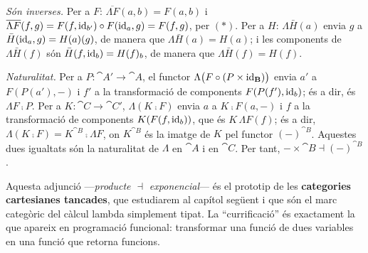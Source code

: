 \begin{prova}
\emph{Són inverses.} Per a $F$: $\overline{\Lambda F}(a,b)=F(a,b)$ i $\overline{\Lambda F}(f,g)=F(f,\operatorname{id}_{b'})\circ F(\operatorname{id}_a,g)=F(f,g)$, per $(\ast)$. Per a $H$: $\Lambda\bar H(a)$ envia $g$ a $\bar H(\operatorname{id}_a,g)=H(a)(g)$, de manera que $\Lambda\bar H(a)=H(a)$; i les components de $\Lambda\bar H(f)$ són $\bar H(f,\operatorname{id}_b)=H(f)_b$, de manera que $\Lambda\bar H(f)=H(f)$.

\emph{Naturalitat.} Per a $P\colon\cat{A}'\to\cat{A}$, el functor $\Lambda\bigl(F\circ(P\times\operatorname{id}_{\mathbf{B}})\bigr)$ envia $a'$ a $F(P(a'),-)$ i $f'$ a la transformació de components $F(P(f'),\operatorname{id}_b)$; és a dir, és $\Lambda F\comp P$. Per a $K\colon\cat{C}\to\cat{C}'$, $\Lambda(K\comp F)$ envia $a$ a $K\comp F(a,-)$ i $f$ a la transformació de components $K(F(f,\operatorname{id}_b))$, que és $K\,\Lambda F(f)$; és a dir, $\Lambda(K\comp F)=K^{\cat{B}}\comp\Lambda F$, on $K^{\cat{B}}$ és la imatge de $K$ pel functor $(-)^{\cat{B}}$. Aquestes dues igualtats són la naturalitat de $\Lambda$ en $\cat{A}$ i en $\cat{C}$. Per tant, $-\times\cat{B}\dashv(-)^{\cat{B}}$.
\end{prova}

\begin{observacio}
Aquesta adjunció ---\emph{producte $\dashv$ exponencial}--- és el prototip de les \textbf{categories cartesianes tancades}, que estudiarem al capítol següent i que són el marc categòric del càlcul lambda simplement tipat. La \enquote{currificació} és exactament la que apareix en programació funcional: transformar una funció de dues variables en una funció que retorna funcions.
\end{observacio}


